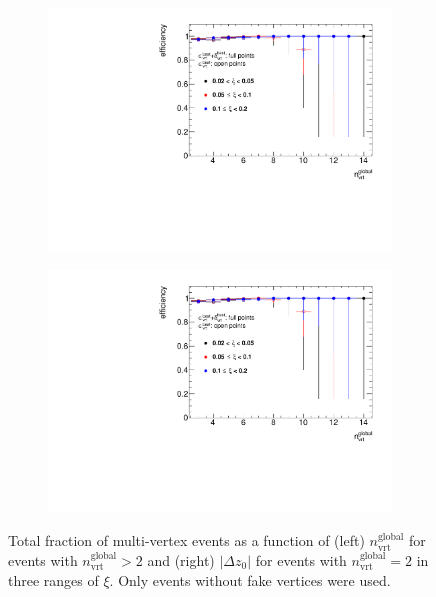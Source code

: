 \begin{figure}[h!]
	\centering
	\begin{subfigure}{.47\textwidth}
		\includegraphics[width=\textwidth,page=2]{chapters/chrgSTAR/img/vertex/vertexEffi_ksi_noFake.pdf}
	\end{subfigure}
	\begin{subfigure}{.47\textwidth}
		\includegraphics[width=\textwidth,page=9]{chapters/chrgSTAR/img/vertex/vertexEffi_ksi_noFake.pdf}
	\end{subfigure}
	\caption{Total fraction of multi-vertex events as a function of (left) $n_\textrm{vrt}^\textrm{global}$ for events with $n^\textrm{global}_\textrm{vrt}>2$ and (right) $|\Delta z_0|$ for events with $n^\textrm{global}_\textrm{vrt}=2$  in three ranges of $\xi$.   Only events without fake vertices were used. }
	\label{fig:vertexVetoDZ_noFake}
\end{figure}

